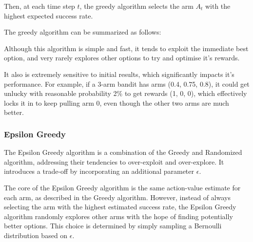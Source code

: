 Then, at each time step $t$, the greedy algorithm selects the arm $A_t$ with the highest expected success rate.

The greedy algorithm can be summarized as follows:


Although this algorithm is simple and fast, it tends to exploit the immediate best option, and very rarely explores other options to try and optimise it's rewards.

It also is extremely sensitive to initial results, which significantly impacts it's performance. For example, if a 3-arm bandit has arms (0.4, 0.75, 0.8), it could get unlucky with reasonable probability 2\% to get rewards (1, 0, 0), which effectively locks it in to keep pulling arm 0, even though the other two arms are much better.

\subsubsection{Epsilon Greedy}
\label{sec:EpsilonGreedy}
The Epsilon Greedy algorithm is a combination of the Greedy and Randomized algorithm, addressing their tendencies to over-exploit and over-explore. It introduces a trade-off by incorporating an additional parameter $\epsilon$.

The core of the Epsilon Greedy algorithm is the same action-value estimate for each arm, as described in the Greedy algorithm. However, instead of always selecting the arm with the highest estimated success rate, the Epsilon Greedy algorithm randomly explores other arms with the hope of finding potentially better options. This choice is determined by simply sampling a Bernoulli distribution based on $\epsilon$.

